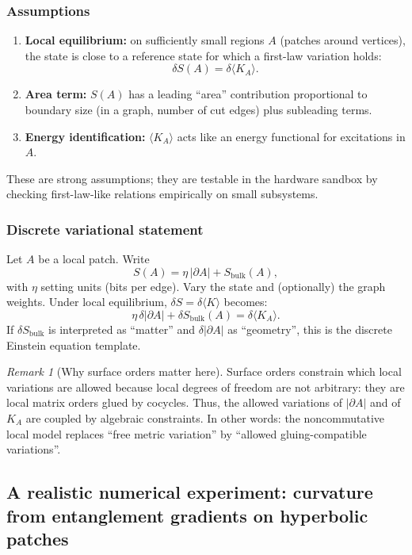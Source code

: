 \documentclass[11pt,oneside]{amsbook}
\numberwithin{equation}{section}
\theoremstyle{plain}
\theoremstyle{definition}
\theoremstyle{remark}
\newtheorem{remark}[theorem]{Remark}
\begin{document}
\subsubsection{Assumptions}
\begin{enumerate}
\item \textbf{Local equilibrium:} on sufficiently small regions $A$ (patches around vertices), the state is close to a reference state for which a first-law variation holds:
\[
\delta S(A) = \delta\langle K_A\rangle.
\]
\item \textbf{Area term:} $S(A)$ has a leading ``area'' contribution proportional to boundary size (in a graph, number of cut edges) plus subleading terms.
\item \textbf{Energy identification:} $\langle K_A\rangle$ acts like an energy functional for excitations in $A$.
\end{enumerate}

These are strong assumptions; they are testable in the hardware sandbox by checking first-law-like relations empirically on small subsystems.

\subsubsection{Discrete variational statement}
Let $A$ be a local patch.
Write
\[
S(A)=\eta\,|\partial A| + S_{\mathrm{bulk}}(A),
\]
with $\eta$ setting units (bits per edge).
Vary the state and (optionally) the graph weights.
Under local equilibrium, $\delta S = \delta\langle K\rangle$ becomes:
\[
\eta\,\delta|\partial A| + \delta S_{\mathrm{bulk}}(A) = \delta\langle K_A\rangle.
\]
If $\delta S_{\mathrm{bulk}}$ is interpreted as ``matter'' and $\delta|\partial A|$ as ``geometry'', this is the discrete Einstein equation template.

\begin{remark}[Why surface orders matter here]
Surface orders constrain which local variations are allowed because local degrees of freedom are not arbitrary: they are local matrix orders glued by cocycles.
Thus, the allowed variations of $|\partial A|$ and of $K_A$ are coupled by algebraic constraints.
In other words: the noncommutative local model replaces ``free metric variation'' by ``allowed gluing-compatible variations''.
\end{remark}

\subsection{A realistic numerical experiment: curvature from entanglement gradients on hyperbolic patches}
\label{sec:hyperbolic_expt}
\end{document}

